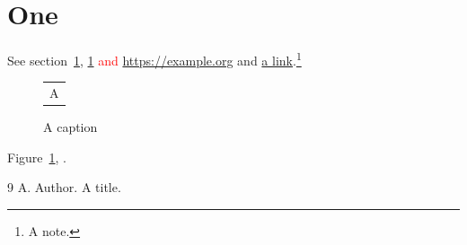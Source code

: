 \documentclass{article}
\begin{document}
\tableofcontents
\section{One}\label{one}
See section~\ref{one}, \textcolor{red}{\ref{one} and \url{https://example.org}} and \href{https://example.com}{a link}.\footnote{A note.}
\begin{figure}[h]\centering\begin{tabular}{c}A\end{tabular}\caption{A caption}\label{f}\end{figure}
Figure~\ref{f}, \cite{k}.
\begin{thebibliography}{9}
 A. Author. A title.
\end{thebibliography}
\end{document}
